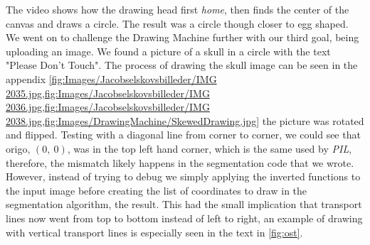 The video shows how the drawing head first {\it home}, then finds the center of the canvas and draws a circle. The result was a circle though closer to egg shaped. \\
We went on to challenge the Drawing Machine further with our third goal, being uploading an image. We found a picture of a skull in a circle with the text "Please Don't Touch". The process of drawing the skull image can be seen in the appendix \cref{fig:Images/Jacobselskovsbilleder/IMG 2035.jpg,fig:Images/Jacobselskovsbilleder/IMG 2036.jpg,fig:Images/Jacobselskovsbilleder/IMG 2038.jpg,fig:Images/DrawingMachine/SkewedDrawing.jpg} the picture was rotated and flipped. Testing with a diagonal line from corner to corner, we could see that origo, $(0,\ 0)$, was in the top left hand corner, which is the same used by {\it PIL}, therefore, the mismatch likely happens in the segmentation code that we wrote. However, instead of trying to debug we simply applying the inverted functions to the input image before creating the list of coordinates to draw in the segmentation algorithm, the result. This had the small implication that transport lines now went from top to bottom instead of left to right, an example of drawing with vertical transport lines is especially seen in the text in \cref{fig:ost}.

